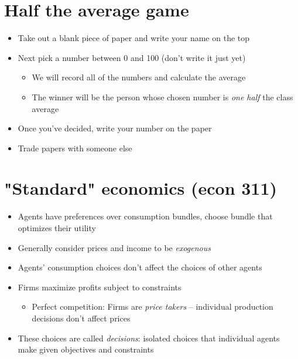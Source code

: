 \documentclass[11pt]{article}
\begin{document}
\section*{Half the average game}
\label{sec:org03b5633}
\begin{itemize}
\item Take out a blank piece of paper and write your name on the top
\item Next pick a number between 0 and 100 (don't write it just yet)
\begin{itemize}
\item We will record all of the numbers and calculate the average
\item The winner will be the person whose chosen number is \emph{one half} the class average
\end{itemize}
\item Once you've decided, write your number on the paper
\item Trade papers with someone else
\end{itemize}

\section*{"Standard" economics (econ 311)}
\label{sec:org390c268}
\begin{itemize}
\item Agents have preferences over consumption bundles, choose bundle that optimizes their utility
\item Generally consider prices and income to be \emph{exogenous}
\item Agents' consumption choices don't affect the choices of other agents
\item Firms maximize profits subject to constraints
\begin{itemize}
\item Perfect competition: Firms are \emph{price takers} -- individual production decisions don't affect prices
\end{itemize}
\item These choices are called \emph{decisions}: isolated choices that individual agents make given objectives and constraints
\end{itemize}
\end{document}
